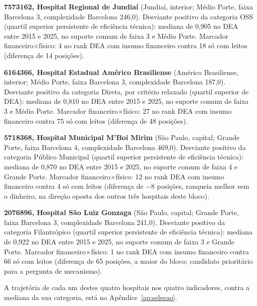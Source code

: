 \newpage
\noindent\textbf{7573162, Hospital Regional de Jundiaí} (Jundiaí, interior; Médio Porte, faixa Barcelona 3, complexidade Barcelona 246,0). Desviante positivo da categoria OSS (quartil superior persistente de eficiência técnica): mediana de 0,905 no DEA entre 2015 e 2025, no suporte comum de faixa 3 e Médio Porte. Marcador financeiro$\times$físico: 4\textordmasculine{} no rank DEA com insumo financeiro contra 18\textordmasculine{} só com leitos (diferença de 14 posições).\par\medskip
\noindent\textbf{6164366, Hospital Estadual Américo Brasiliense} (Américo Brasiliense, interior; Médio Porte, faixa Barcelona 3, complexidade Barcelona 187,0). Desviante positivo da categoria Direta, por critério relaxado (quartil superior de DEA): mediana de 0,810 no DEA entre 2015 e 2025, no suporte comum de faixa 3 e Médio Porte. Marcador financeiro$\times$físico: 27\textordmasculine{} no rank DEA com insumo financeiro contra 75\textordmasculine{} só com leitos (diferença de 48 posições).\par\medskip
\noindent\textbf{5718368, Hospital Municipal M'Boi Mirim} (São Paulo, capital; Grande Porte, faixa Barcelona 4, complexidade Barcelona 469,0). Desviante positivo da categoria Público Municipal (quartil superior persistente de eficiência técnica): mediana de 0,870 no DEA entre 2015 e 2025, no suporte comum de faixa 4 e Grande Porte. Marcador financeiro$\times$físico: 12\textordmasculine{} no rank DEA com insumo financeiro contra 4\textordmasculine{} só com leitos (diferença de $-$8 posições, ranqueia melhor sem o dinheiro, na direção oposta dos outros três hospitais deste bloco).\par\medskip
\noindent\textbf{2076896, Hospital São Luiz Gonzaga} (São Paulo, capital; Grande Porte, faixa Barcelona 3, complexidade Barcelona 241,0). Desviante positivo da categoria Filantrópico (quartil superior persistente de eficiência técnica): mediana de 0,922 no DEA entre 2015 e 2025, no suporte comum de faixa 3 e Grande Porte. Marcador financeiro$\times$físico: 1\textordmasculine{} no rank DEA com insumo financeiro contra 66\textordmasculine{} só com leitos (diferença de 65 posições, a maior do bloco; candidato prioritário para a pergunta de mecanismo).\par\medskip

\noindent A trajetória de cada um destes quatro hospitais nos quatro
indicadores, contra a mediana da sua categoria, está no
Apêndice~\ref{ap:selecao}.

